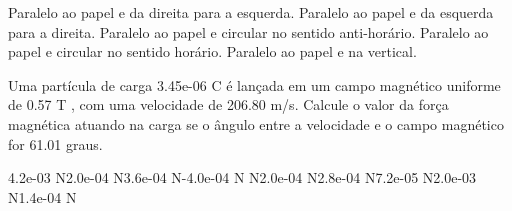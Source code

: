 \documentclass[12pt, addpoints]{exam}
\begin{document}
\begin{questions}
\begin{multicols*}{2}
\begin{choices}
\choice Paralelo ao papel e da direita para a esquerda. 
\choice Paralelo ao papel e da esquerda para a direita. 
\choice Paralelo ao papel e circular no sentido anti-horário. 
\choice Paralelo ao papel e circular no sentido horário. 
\choice Paralelo ao papel e na vertical. 
\end{choices}
\question Uma partícula de carga 3.45e-06 C é lançada em um campo magnético uniforme de    0.57 T , com uma velocidade de 206.80 m/s. Calcule o valor da força magnética atuando na carga se o ângulo entre a velocidade e o campo magnético for   61.01 graus.

\begin{oneparchoices}
\choice 4.2e-03 N\choice 2.0e-04 N\choice 3.6e-04 N\choice -4.0e-04 N N\choice 2.0e-04 N\choice 2.8e-04 N\choice 7.2e-05 N\choice 2.0e-03 N\choice 1.4e-04 N
\end{oneparchoices}\end{multicols*}
\end{questions}
\newpage
\end{document}
